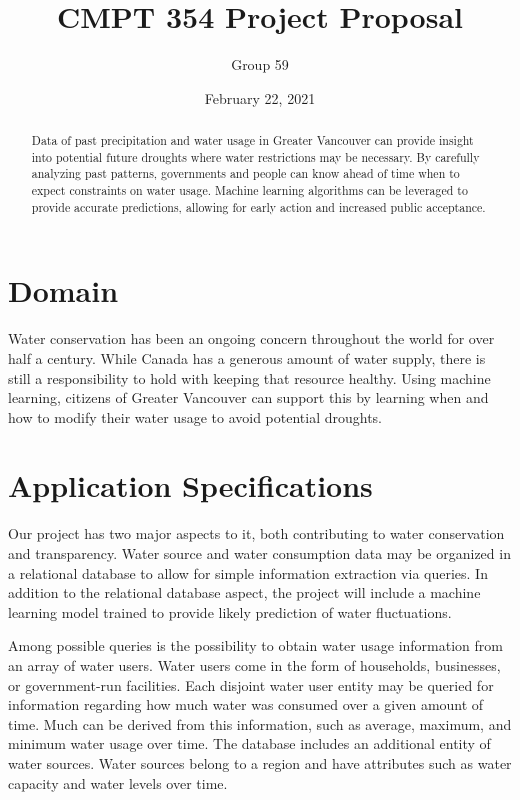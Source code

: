 \documentclass{article}
\title{CMPT 354 Project Proposal}
\author{Group 59}
\date{February 22, 2021}
\begin{document}
\maketitle

\begin{abstract}
    Data of past precipitation and water usage in Greater Vancouver can provide insight into potential future droughts where water restrictions may be necessary. By carefully analyzing past patterns, governments and people can know ahead of time when to expect constraints on water usage. Machine learning algorithms can be leveraged to provide accurate predictions, allowing for early action and increased public acceptance.
\end{abstract}

\section{Domain}
Water conservation has been an ongoing concern throughout the world for over half a century. While Canada has a generous amount of water supply, there is still a responsibility to hold with keeping that resource healthy. Using machine learning, citizens of Greater Vancouver can support this by learning when and how to modify their water usage to avoid potential droughts.

\section{Application Specifications}
Our project has two major aspects to it, both contributing to water conservation and transparency. Water source and water consumption data may be organized in a relational database to allow for simple information extraction via queries. In addition to the relational database aspect, the project will include a machine learning model trained to provide likely prediction of water fluctuations.

Among possible queries is the possibility to obtain water usage information from an array of water users. Water users come in the form of households, businesses, or government-run facilities. Each disjoint water user entity may be queried for information regarding how much water was consumed over a given amount of time. Much can be derived from this information, such as average, maximum, and minimum water usage over time. The database includes an additional entity of water sources. Water sources belong to a region and have attributes such as water capacity and water levels over time.
\end{document}
